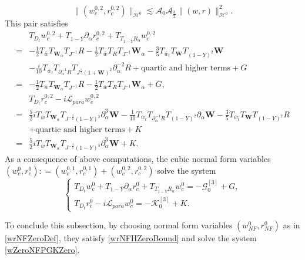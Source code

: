 \documentclass[10pt]{amsart}
\theoremstyle{remark}
\theoremstyle{definition}
\numberwithin{equation}{section}
\newcommand{\p}{\partial}
\renewcommand{\H}{{\mathcal H }}
\newcommand{\al}{\alpha}
\newcommand{\f}{\frac}
\newcommand{\bw}{\mathbf{W}}
\begin{document}
\begin{equation*}
\|(w^{0,2}_c, r^{0,2}_c)\|_{\H^0}  \lesssim\mathcal{A}_0 \mathcal{A}_\f32\|(w,r)\|^2_{\H^0}.
\end{equation*}
This pair satisfies 
\begin{align*} 
&T_{D_t}w^{0,2}_c+T_{1-\bar{Y}}\p_\al r^{0,2}_c+T_{T_{1-\bar{Y}}R_{\al}}w^{0,2}_c\\
=& -\f12 T_{\bar{w}}T_{\bw_\al}T_{J^{-1}}R -\f12  T_{\bar{w}}T_R T_{J^{-1}}\bw_\al -\f35 T_{\bar{w}_t}T_{\bw}T_{(1-Y)^2}\bw \\
&- \f{i}{10} T_{\bar{w}_t}T_{\p_\al^{-1}R}  T_{J^{\frac{1}{2}}(1+\bw)^2}  \p_\al^{-2}R  + \text{quartic and higher terms} + G\\
=& -\f12 T_{\bar{w}}T_{\bw_\al}T_{J^{-1}}R -\f12  T_{\bar{w}}T_R T_{J^{-1}}\bw_\al + G,\\
&T_{D_t}r^{0,2}_c-i\mathcal{L}_{para}w^{0,2}_c  \\
=& \f52i T_{\bar{w}} T_{\bw_\al} T_{J^{-\f32}(1-Y)^3} \p_\al^3 \bw  -\f{1}{10} T_{\bar{w}_t}T_{\p_\al^{-1}R}T_{(1-Y)^2}\p_\al\bw-\f35 T_{\bar{w}_t}T_{\bw}T_{(1-Y)^2}  R \\
&+\text{quartic and higher terms} + K\\
=& \f52i T_{\bar{w}} T_{\bw_\al} T_{J^{-\f32}(1-Y)^3} \p_\al^3 \bw + K.
\end{align*}
As a consequence of above computations, the cubic normal form variables $(w^0_c, r^0_c): = (w^{0,1}_c, r^{0,1}_c) + (w^{0,2}_c, r^{0,2}_c)$ solve the system 
\begin{equation*} 
\begin{cases}
T_{D_t}w^0_c+T_{1-\bar{Y}}\p_\al r^0_c+T_{T_{1-\bar{Y}}R_{\al}}w^0_c= - \mathcal{G}_0^{[3]} + G,\\
T_{D_t}r^0_c-i\mathcal{L}_{para}w^0_c=- \mathcal{K}_0^{[3]} +K.
\end{cases}
\end{equation*}

To conclude this subsection, by choosing normal form variables $(w_{NF}^0, r_{NF}^0)$ as in \eqref{wrNFZeroDef}, they satisfy \eqref{wrNFHZeroBound} and solve the system \eqref{wZeroNFPGKZero}.
\end{document}
